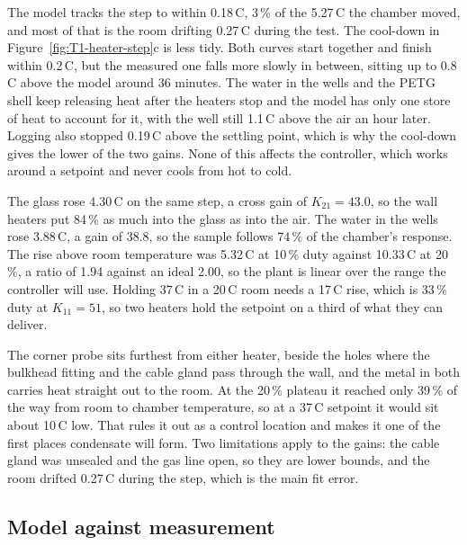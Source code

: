 The model tracks the step to within 0.18\,\textdegree{}C, 3\,\% of the 5.27\,\textdegree{}C the chamber moved, and most of that is the room drifting 0.27\,\textdegree{}C during the test. The cool-down in Figure~\ref{fig:T1-heater-step}c is less tidy. Both curves start together and finish within 0.2\,\textdegree{}C, but the measured one falls more slowly in between, sitting up to 0.8\,\textdegree{}C above the model around 36 minutes. The water in the wells and the PETG shell keep releasing heat after the heaters stop and the model has only one store of heat to account for it, with the well still 1.1\,\textdegree{}C above the air an hour later. Logging also stopped 0.19\,\textdegree{}C above the settling point, which is why the cool-down gives the lower of the two gains. None of this affects the controller, which works around a setpoint and never cools from hot to cold.

The glass rose 4.30\,\textdegree{}C on the same step, a cross gain of $K_{21} = 43.0$, so the wall heaters put 84\,\% as much into the glass as into the air. The water in the wells rose 3.88\,\textdegree{}C, a gain of 38.8, so the sample follows 74\,\% of the chamber's response. The rise above room temperature was 5.32\,\textdegree{}C at 10\,\% duty against 10.33\,\textdegree{}C at 20\,\%, a ratio of 1.94 against an ideal 2.00, so the plant is linear over the range the controller will use. Holding 37\,\textdegree{}C in a 20\,\textdegree{}C room needs a 17\,\textdegree{}C rise, which is 33\,\% duty at $K_{11} = 51$, so two heaters hold the setpoint on a third of what they can deliver.

  
 The corner probe sits furthest from either heater, beside the holes where the bulkhead fitting and the cable gland pass through the wall, and the metal in both carries heat straight out to the room. At the 20\,\% plateau it reached only 39\,\% of the way from room to chamber temperature, so at a 37\,\textdegree{}C setpoint it would sit about 10\,\textdegree{}C low. That rules it out as a control location and makes it one of the first places condensate will form. Two limitations apply to the gains: the cable gland was unsealed and the gas line open, so they are lower bounds, and the room drifted 0.27\,\textdegree{}C during the step, which is the main fit error.

\subsection{Model against measurement}
\label{subsec:sysid-chamber-vs-model}

